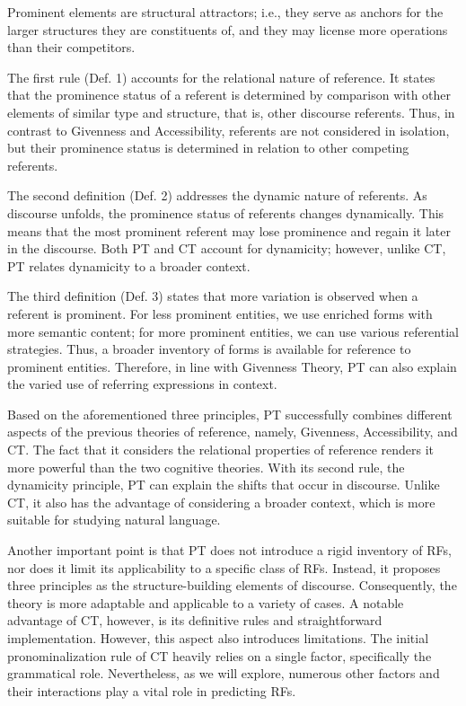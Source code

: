 \begin{definition}
	Prominent elements are structural attractors; i.e., they serve as anchors for the larger structures they are constituents of, and they
	may license more operations than their competitors.
\end{definition}

The first rule (Def. 1) accounts for the relational nature of reference. It states that the prominence status of a referent is determined by comparison with other elements of similar type and structure, that is, other discourse referents. Thus, in contrast to Givenness and Accessibility, referents are not considered in isolation, but their prominence status is determined in relation to other competing referents.

The second definition (Def. 2) addresses the dynamic nature of referents. As discourse unfolds, the prominence status of referents changes dynamically. This means that the most prominent referent may lose prominence and regain it later in the discourse. Both PT and CT account for dynamicity; however, unlike CT, PT relates dynamicity to a broader context.

The third definition (Def. 3) states that more variation is observed when a referent is prominent. For less prominent entities, we use enriched forms with more semantic content; for more prominent entities, we can use various referential strategies. Thus, a broader inventory of forms is available for reference to prominent entities. Therefore, in line with Givenness Theory, PT can also explain the varied use of referring expressions in context.

Based on the aforementioned three principles, PT successfully combines different aspects of the previous theories of reference, namely, Givenness, Accessibility, and CT. The fact that it considers the relational properties of reference renders it more powerful than the two cognitive theories. With its second rule, the dynamicity principle, PT can explain the shifts that occur in discourse. Unlike CT, it also has the advantage of considering a broader context, which is more suitable for studying natural language.

Another important point is that PT does not introduce a rigid inventory of RFs, nor does it limit its applicability to a specific class of RFs. Instead, it proposes three principles as the structure-building elements of discourse. Consequently, the theory is more adaptable and applicable to a variety of cases. A notable advantage of CT, however, is its definitive rules and straightforward implementation. However, this aspect also introduces limitations. The initial pronominalization rule of CT heavily relies on a single factor, specifically the grammatical role. Nevertheless, as we will explore, numerous other factors and their interactions play a vital role in predicting RFs. 

